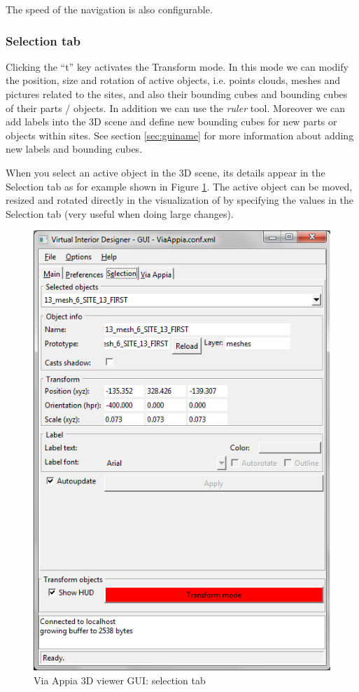 \documentclass[a4paper,11pt]{article}
\begin{document}
The speed of the navigation is also configurable.

\subsubsection{Selection tab}

Clicking the ``t'' key activates the Transform mode. In this mode we can modify the position, size and rotation of active objects, i.e. points clouds, meshes and pictures related to the sites, and also their bounding cubes and bounding cubes of their parts / objects. In addition we can use the \textit{ruler} tool. Moreover we can add labels into the 3D scene and define new bounding cubes for new parts or objects within sites. See section \ref{sec:guiname} for more information about adding new labels and bounding cubes.

When you select an active object in the 3D scene, its details appear in the Selection tab as for example shown in Figure \ref{fig-guisel}. The active object can be moved, resized and rotated directly in the visualization of by specifying the values in the Selection tab (very useful when doing large changes).

\begin{figure}[!ht]
\centering
\includegraphics[scale=0.5]{fig/selection}
\caption{Via Appia 3D viewer GUI: selection tab}
\label{fig-guisel}
\end{figure}
\end{document}

